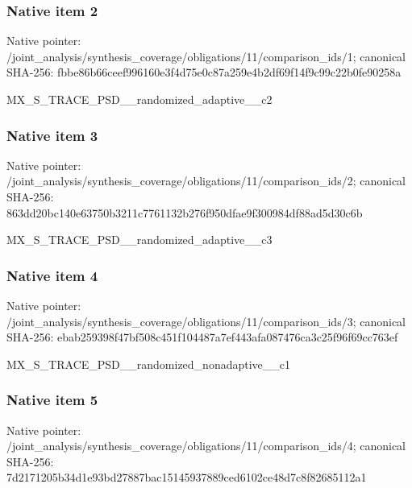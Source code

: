 \documentclass[10pt,a4paper]{article}
\begin{document}
\subsubsection{Native item 2}
Native pointer: /joint\_\allowbreak{}analysis/synthesis\_\allowbreak{}coverage/obligations/11/comparison\_\allowbreak{}ids/1; canonical SHA-256: fbbe86b66ceef996160e3f4d75e0c87a259e4b2df69f14f9c99c22b0fe90258a

\begingroup\raggedright\sloppy MX\_\allowbreak{}S\_\allowbreak{}TRACE\_\allowbreak{}PSD\_\allowbreak{}\_\allowbreak{}randomized\_\allowbreak{}adaptive\_\allowbreak{}\_\allowbreak{}c2\par\endgroup

\subsubsection{Native item 3}
Native pointer: /joint\_\allowbreak{}analysis/synthesis\_\allowbreak{}coverage/obligations/11/comparison\_\allowbreak{}ids/2; canonical SHA-256: 863dd20bc140e63750b3211c7761132b276f950dfae9f300984df88ad5d30c6b

\begingroup\raggedright\sloppy MX\_\allowbreak{}S\_\allowbreak{}TRACE\_\allowbreak{}PSD\_\allowbreak{}\_\allowbreak{}randomized\_\allowbreak{}adaptive\_\allowbreak{}\_\allowbreak{}c3\par\endgroup

\subsubsection{Native item 4}
Native pointer: /joint\_\allowbreak{}analysis/synthesis\_\allowbreak{}coverage/obligations/11/comparison\_\allowbreak{}ids/3; canonical SHA-256: ebab259398f47bf508c451f104487a7ef443afa087476ca3c25f96f69cc763ef

\begingroup\raggedright\sloppy MX\_\allowbreak{}S\_\allowbreak{}TRACE\_\allowbreak{}PSD\_\allowbreak{}\_\allowbreak{}randomized\_\allowbreak{}nonadaptive\_\allowbreak{}\_\allowbreak{}c1\par\endgroup

\subsubsection{Native item 5}
Native pointer: /joint\_\allowbreak{}analysis/synthesis\_\allowbreak{}coverage/obligations/11/comparison\_\allowbreak{}ids/4; canonical SHA-256: 7d2171205b34d1e93bd27887bac15145937889ced6102ce48d7c8f82685112a1
\end{document}

